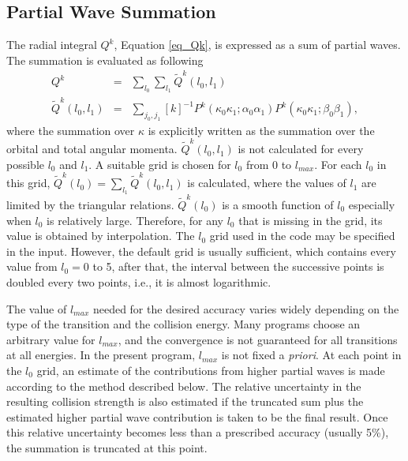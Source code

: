 \documentclass{elsart}
\begin{document}
\subsection{Partial Wave Summation}
The radial integral $Q^k$, Equation \ref{eq_Qk}, is expressed as a sum of
partial waves. The summation is evaluated as following
\begin{eqnarray}
Q^k &=& \sum_{l_0}\sum_{l_1} \tilde{Q}^k(l_0,l_1) \nonumber\\
\tilde{Q}^k(l_0,l_1) &=& \sum_{j_0,j_1}
[k]^{-1}P^k(\kappa_0\kappa_1;\alpha_0\alpha_1)
P^k(\kappa_0\kappa_1;\beta_0\beta_1),
\end{eqnarray}
where the summation over $\kappa$ is explicitly written as the summation
over the orbital and total angular
momenta. $\tilde{Q}^k(l_0,l_1)$ is not calculated for every possible $l_0$
and $l_1$. A suitable grid is chosen for $l_0$ from 0 to $l_{max}$. For each 
$l_0$ in this grid, $\tilde{Q}^k(l_0) = \sum_{l_1}\tilde{Q}^k(l_0,l_1)$ is
calculated, where the values of $l_1$ are limited by the triangular
relations. $\tilde{Q}^k(l_0)$ is a smooth function of $l_0$ especially when 
$l_0$ is relatively large. Therefore, for any $l_0$ that is missing in the
grid, its value is obtained by interpolation. The $l_0$ grid used
in the code may be specified in the input. However, the default grid is
usually sufficient, which contains every value from $l_0 = 0$ to 5, after
that, the interval between the successive points is doubled every two points,
i.e., it is almost logarithmic. 

The value of $l_{max}$ needed for the desired accuracy varies widely depending
on the type of the transition and the collision energy. Many programs choose
an arbitrary value for $l_{max}$, and the convergence is not guaranteed for
all transitions at all energies. In the present program, 
$l_{max}$ is not fixed a \textit{priori}. At each point in the $l_0$ grid, an
estimate of the contributions from higher partial waves is made according to
the method described below. The relative uncertainty in the resulting
collision strength is also estimated if the truncated sum plus the estimated
higher partial wave contribution is taken to be the final result. Once this
relative uncertainty becomes less than a prescribed accuracy (usually 5\%),
the summation is truncated at this point.
\end{document}
